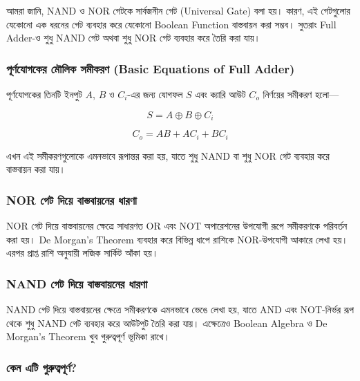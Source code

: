 আমরা জানি, \textenglish{NAND} ও \textenglish{NOR} গেটকে
সার্বজনীন গেট (\textenglish{Universal Gate}) বলা হয়।
কারণ, এই গেটগুলোর যেকোনো এক ধরনের গেট ব্যবহার করে
যেকোনো \textenglish{Boolean Function} বাস্তবায়ন করা সম্ভব।
সুতরাং \textenglish{Full Adder}-ও শুধু \textenglish{NAND} গেট
অথবা শুধু \textenglish{NOR} গেট ব্যবহার করে তৈরি করা যায়।

\subsubsection*{পূর্ণযোগকের মৌলিক সমীকরণ
(\textenglish{Basic Equations of Full Adder})}

পূর্ণযোগকের তিনটি ইনপুট \(A\), \(B\) ও \(C_i\)-এর জন্য
যোগফল \(S\) এবং ক্যারি আউট \(C_o\) নির্ণয়ের সমীকরণ হলো—

\[
S=A\oplus B\oplus C_i
\]

\[
C_o=AB+AC_i+BC_i
\]

এখন এই সমীকরণগুলোকে এমনভাবে রূপান্তর করা হয়,
যাতে শুধু \textenglish{NAND} বা শুধু \textenglish{NOR} গেট ব্যবহার করে
বাস্তবায়ন করা যায়।

\subsubsection*{\textenglish{NOR} গেট দিয়ে বাস্তবায়নের ধারণা}

\textenglish{NOR} গেট দিয়ে বাস্তবায়নের ক্ষেত্রে
সাধারণত \textenglish{OR} এবং \textenglish{NOT} অপারেশনের উপযোগী রূপে
সমীকরণকে পরিবর্তন করা হয়। \textenglish{De Morgan's Theorem} ব্যবহার করে
বিভিন্ন ধাপে রাশিকে \textenglish{NOR}-উপযোগী আকারে লেখা হয়।
এরপর প্রাপ্ত রাশি অনুযায়ী লজিক সার্কিট আঁকা হয়।

\subsubsection*{\textenglish{NAND} গেট দিয়ে বাস্তবায়নের ধারণা}

\textenglish{NAND} গেট দিয়ে বাস্তবায়নের ক্ষেত্রে
সমীকরণকে এমনভাবে ভেঙে লেখা হয়, যাতে
\textenglish{AND} এবং \textenglish{NOT}-নির্ভর রূপ থেকে
শুধু \textenglish{NAND} গেট ব্যবহার করে আউটপুট তৈরি করা যায়।
এক্ষেত্রেও \textenglish{Boolean Algebra} ও \textenglish{De Morgan's Theorem}
খুব গুরুত্বপূর্ণ ভূমিকা রাখে।

\subsubsection*{কেন এটি গুরুত্বপূর্ণ?}

